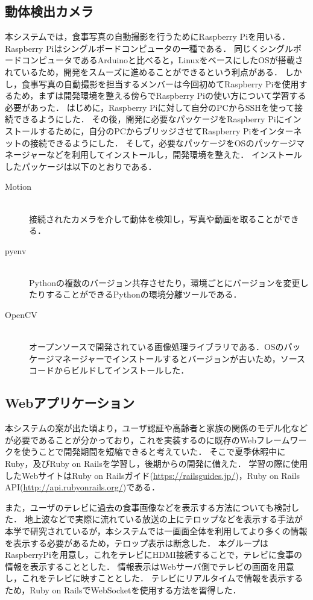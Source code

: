 \documentclass[../report]{subfiles}
\begin{document}
\subsection{動体検出カメラ}
本システムでは，食事写真の自動撮影を行うためにRaspberry Piを用いる．
Raspberry Piはシングルボードコンピュータの一種である．
同じくシングルボードコンピュータであるArduinoと比べると，LinuxをベースにしたOSが搭載されているため，開発をスムーズに進めることができるという利点がある．
しかし，食事写真の自動撮影を担当するメンバーは今回初めてRaspberry Piを使用するため，まずは開発環境を整える傍らでRaspberry Piの使い方について学習する必要があった．
はじめに，Raspberry Piに対して自分のPCからSSHを使って接続できるようにした．
その後，開発に必要なパッケージをRaspberry Piにインストールするために，自分のPCからブリッジさせてRaspberry Piをインターネットの接続できるようにした．
そして，必要なパッケージをOSのパッケージマネージャーなどを利用してインストールし，開発環境を整えた．
インストールしたパッケージは以下のとおりである．
\begin{description}
    \item[Motion] \mbox{}\\
    接続されたカメラを介して動体を検知し，写真や動画を取ることができる．
    \item[pyenv] \mbox{}\\
    Pythonの複数のバージョン共存させたり，環境ごとにバージョンを変更したりすることができるPythonの環境分離ツールである．
    \item[OpenCV] \mbox{}\\
    オープンソースで開発されている画像処理ライブラリである．OSのパッケージマネージャーでインストールするとバージョンが古いため，ソースコードからビルドしてインストールした．
\end{description}


\subsection{Webアプリケーション} \label{sec:3-webapp}
本システムの案が出た頃より，ユーザ認証や高齢者と家族の関係のモデル化などが必要であることが分かっており，これを実装するのに既存のWebフレームワークを使うことで開発期間を短縮できると考えていた．
そこで夏季休暇中にRuby，及びRuby on Railsを学習し，後期からの開発に備えた．
学習の際に使用したWebサイトはRuby on Railsガイド(\url{https://railsguides.jp/})，Ruby on Rails API(\url{http://api.rubyonrails.org/})である．

また，ユーザのテレビに過去の食事画像などを表示する方法についても検討した．
地上波などで実際に流れている放送の上にテロップなどを表示する手法が本学で研究されているが，本システムでは一画面全体を利用してより多くの情報を表示する必要があるため，テロップ表示は断念した．
本グループはRaspberryPiを用意し，これをテレビにHDMI接続することで，テレビに食事の情報を表示することとした．
情報表示はWebサーバ側でテレビの画面を用意し，これをテレビに映すこととした．
テレビにリアルタイムで情報を表示するため，Ruby on RailsでWebSocketを使用する方法を習得した．
\end{document}

